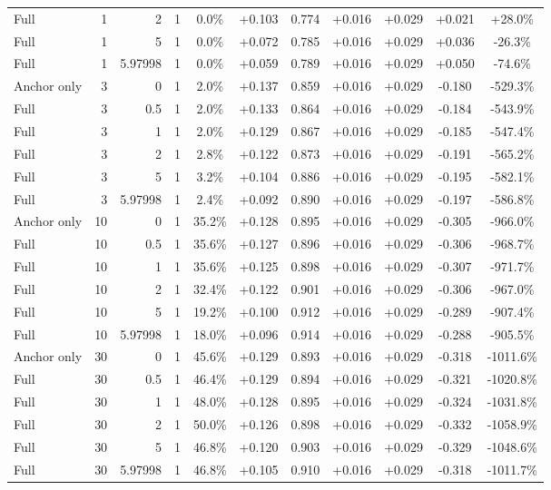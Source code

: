 \begin{table}[htbp]
\begin{tabular}{lrrrccccccc}
Full & 1 & 2 & 1 & 0.0\% & +0.103 & 0.774 & +0.016 & +0.029 & +0.021 & +28.0\% \\
Full & 1 & 5 & 1 & 0.0\% & +0.072 & 0.785 & +0.016 & +0.029 & +0.036 & -26.3\% \\
Full & 1 & 5.97998 & 1 & 0.0\% & +0.059 & 0.789 & +0.016 & +0.029 & +0.050 & -74.6\% \\
Anchor only & 3 & 0 & 1 & 2.0\% & +0.137 & 0.859 & +0.016 & +0.029 & -0.180 & -529.3\% \\
Full & 3 & 0.5 & 1 & 2.0\% & +0.133 & 0.864 & +0.016 & +0.029 & -0.184 & -543.9\% \\
Full & 3 & 1 & 1 & 2.0\% & +0.129 & 0.867 & +0.016 & +0.029 & -0.185 & -547.4\% \\
Full & 3 & 2 & 1 & 2.8\% & +0.122 & 0.873 & +0.016 & +0.029 & -0.191 & -565.2\% \\
Full & 3 & 5 & 1 & 3.2\% & +0.104 & 0.886 & +0.016 & +0.029 & -0.195 & -582.1\% \\
Full & 3 & 5.97998 & 1 & 2.4\% & +0.092 & 0.890 & +0.016 & +0.029 & -0.197 & -586.8\% \\
Anchor only & 10 & 0 & 1 & 35.2\% & +0.128 & 0.895 & +0.016 & +0.029 & -0.305 & -966.0\% \\
Full & 10 & 0.5 & 1 & 35.6\% & +0.127 & 0.896 & +0.016 & +0.029 & -0.306 & -968.7\% \\
Full & 10 & 1 & 1 & 35.6\% & +0.125 & 0.898 & +0.016 & +0.029 & -0.307 & -971.7\% \\
Full & 10 & 2 & 1 & 32.4\% & +0.122 & 0.901 & +0.016 & +0.029 & -0.306 & -967.0\% \\
Full & 10 & 5 & 1 & 19.2\% & +0.100 & 0.912 & +0.016 & +0.029 & -0.289 & -907.4\% \\
Full & 10 & 5.97998 & 1 & 18.0\% & +0.096 & 0.914 & +0.016 & +0.029 & -0.288 & -905.5\% \\
Anchor only & 30 & 0 & 1 & 45.6\% & +0.129 & 0.893 & +0.016 & +0.029 & -0.318 & -1011.6\% \\
Full & 30 & 0.5 & 1 & 46.4\% & +0.129 & 0.894 & +0.016 & +0.029 & -0.321 & -1020.8\% \\
Full & 30 & 1 & 1 & 48.0\% & +0.128 & 0.895 & +0.016 & +0.029 & -0.324 & -1031.8\% \\
Full & 30 & 2 & 1 & 50.0\% & +0.126 & 0.898 & +0.016 & +0.029 & -0.332 & -1058.9\% \\
Full & 30 & 5 & 1 & 46.8\% & +0.120 & 0.903 & +0.016 & +0.029 & -0.329 & -1048.6\% \\
Full & 30 & 5.97998 & 1 & 46.8\% & +0.105 & 0.910 & +0.016 & +0.029 & -0.318 & -1011.7\% \\

\end{tabular}
\end{table}
